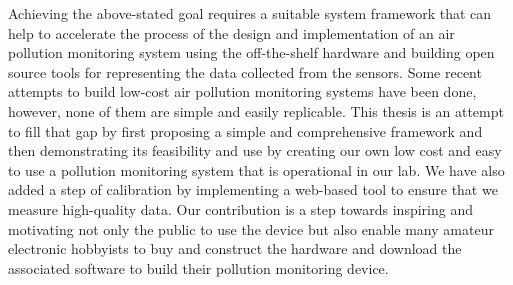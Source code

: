 \par

Achieving the above-stated goal requires a suitable system framework that can help to accelerate the process of the design and implementation of an air pollution monitoring system using the off-the-shelf hardware and building open source tools for representing the data collected from the sensors. Some recent attempts to build low-cost air pollution monitoring systems have been done, however, none of them are simple and easily replicable. This thesis is an attempt to fill that gap by first proposing a simple and comprehensive framework and then demonstrating its feasibility and use by creating our own low cost and easy to use a pollution monitoring system that is operational in our lab. We have also added a step of calibration by implementing a web-based tool to ensure that we measure high-quality data. Our contribution is a step towards inspiring and motivating not only the public to use the device but also enable many amateur electronic hobbyists to buy and construct the hardware and download the associated software to build their pollution monitoring device.

